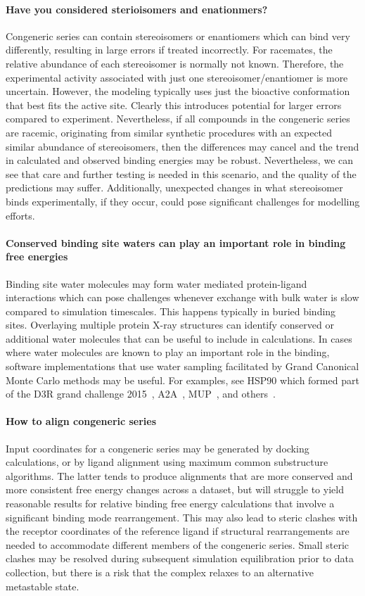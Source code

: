 \documentclass[9pt,bestpractices]{livecoms}
\begin{document}
\paragraph{Have you considered sterioisomers and enationmers?}
Congeneric series can contain stereoisomers or enantiomers which can bind very differently, resulting in large errors if treated incorrectly. For racemates, the relative abundance of each stereoisomer is normally not known. Therefore, the experimental activity associated with just one stereoisomer/enantiomer is more uncertain. However, the modeling typically uses just the bioactive conformation that best fits the active site. Clearly this introduces potential for larger errors compared to experiment. Nevertheless, if all compounds in the congeneric series are racemic, originating from similar synthetic procedures with an expected similar abundance of stereoisomers, then the differences may cancel and the trend in calculated and observed binding energies may be robust. Nevertheless, we can see that care and further testing is needed in this scenario, and the quality of the predictions may suffer. Additionally, unexpected changes in what stereoisomer binds experimentally, if they occur, could pose significant challenges for modelling efforts.
%
\paragraph{Conserved binding site waters can play an important role in binding free energies}
Binding site water molecules may form water mediated protein-ligand interactions which can pose challenges whenever exchange with bulk water is slow compared to simulation timescales. This happens typically in buried binding sites. Overlaying multiple protein X-ray structures can identify conserved or additional water molecules that can be useful to include in calculations. In cases where water molecules are known to play an important role in the binding, software implementations that use water sampling facilitated by Grand Canonical Monte Carlo methods may be useful. For examples, see HSP90 which formed part of the D3R grand challenge 2015~\cite{mey2016blinded}, A2A~\cite{brucemacdonald2018ligand}, MUP~\cite{ross2015water}, and others~\cite{michel2009energetics}.
%
\paragraph{How to align congeneric series}
Input coordinates for a congeneric series may be generated by docking calculations, or by ligand alignment using maximum common substructure algorithms. The latter tends to produce alignments that are more conserved and more consistent free energy changes across a dataset, but will struggle to yield reasonable results for relative binding free energy calculations that involve a significant binding mode rearrangement. This may also lead to steric clashes with the receptor coordinates of the reference ligand if structural rearrangements are needed to accommodate different members of the congeneric series. Small steric clashes may be resolved during subsequent simulation equilibration prior to data collection, but there is a risk that the complex relaxes to an alternative metastable state. 
\end{document}
